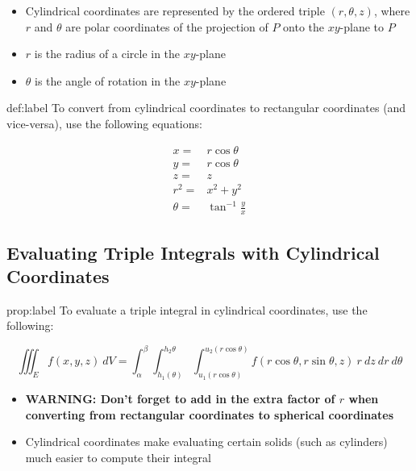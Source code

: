 \documentclass{package/notes}
\begin{document}
\begin{itemize}
	\item Cylindrical coordinates are represented by the ordered triple $(r,\theta,z)$, where $r$ and $\theta$ are polar coordinates of the projection of $P$ onto the $xy$-plane to $P$
	\item $r$ is the radius of a circle in the $xy$-plane
	\item $\theta$ is the angle of rotation in the $xy$-plane
\end{itemize}

\begin{definition}{def:label} %
	To convert from cylindrical coordinates to rectangular coordinates (and vice-versa), use the following equations:

	$$
	\begin{aligned}
		x =& r\cos\theta\\
		y=&r\cos\theta\\
		z=&z\\
		r^2 =& x^2 + y^2\\
		\theta =& \tan^{-1}\frac{y}{x}
		\end{aligned}
	$$
\end{definition}


\subsection{Evaluating Triple Integrals with Cylindrical Coordinates}

\begin{proposition}{prop:label}
	To evaluate a triple integral in cylindrical coordinates, use the following:

	$$\iiint_Ef(x,y,z)\:dV=\int_\alpha^\beta\int_{h_1(\theta)}^{h_2{\theta}}\int_{u_1(r\cos\theta)}^{u_2(r\cos\theta)}f(r\cos\theta,r\sin\theta,z)\:r\:dz\:dr\:d\theta$$
\end{proposition}

\begin{itemize}
	\item \textbf{WARNING: Don't forget to add in the extra factor of $r$ when converting from rectangular coordinates to spherical coordinates}
	\item Cylindrical coordinates make evaluating certain solids (such as cylinders) much easier to compute their integral
\end{itemize}
\end{document}

